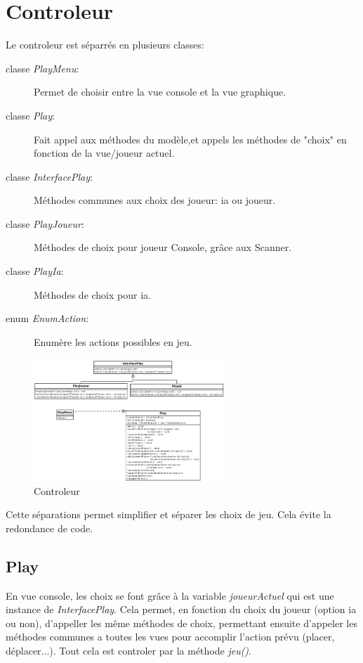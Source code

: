       \section{Controleur}

        Le controleur est séparrés en plusieurs classes:
        \begin{description}
            \item[classe \textit{PlayMenu}:]{Permet de choisir entre la vue console et la vue graphique.}
            \item[classe \textit{Play}:]{Fait appel aux méthodes du modèle,et appels les méthodes de "choix" en fonction de la vue/joueur actuel.}
            \item[classe \textit{InterfacePlay}:]{Méthodes communes aux choix des joueur: ia ou joueur.}
            \item[classe \textit{PlayJoueur}:]{Méthodes de choix pour joueur Console, grâce aux Scanner.}
            \item[classe \textit{PlayIa}:]{Méthodes de choix pour ia.}
            \item[enum \textit{EnumAction}:]{Enumère les actions possibles en jeu.}
		\end{description}


        \begin{figure}[H]
			\centering\includegraphics[width=0.64\textwidth, keepaspectratio]{img/diaControleur.png}
			\caption{Controleur}
			\label{fig:diaControleur}
		\end{figure}

        Cette séparations permet simplifier et séparer les choix de jeu. Cela évite la redondance de code.

        \subsection{Play}

        En vue console, les choix se font grâce à la variable \textit{joueurActuel} qui est une instance de \textit{InterfacePlay}. Cela permet, en fonction du choix du joueur (option ia ou non), d'appeller les même méthodes de choix, permettant ensuite d'appeler les méthodes communes a toutes les vues pour accomplir l'action prévu (placer, déplacer...). Tout cela est controler par la méthode \textit{jeu()}.

